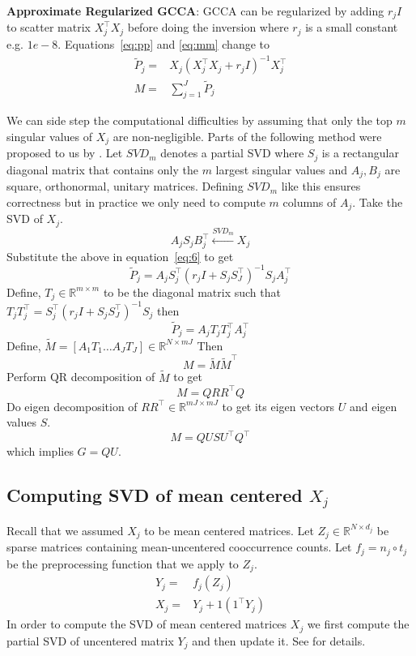 \documentclass[11pt]{article}
\begin{document}
\noindent\textbf{Approximate Regularized GCCA}: GCCA can be regularized by adding $r_jI$ to 
scatter matrix $X_j^\top X_j$ before doing the inversion where
$r_j$ is a small constant e.g. $1e-8$. Equations~\ref{eq:pp}
and \ref{eq:mm} change to
\begin{align}
  \widetilde{P}_{j} =& X_j(X_j^\top X_j+r_jI)^{-1}X_j^\top \label{eq:6}\\
  M =& \sum_{j=1}^J \widetilde{P}_{j} \label{eq:mmm}
\end{align}

We can side step the computational difficulties by assuming that only
the top $m$ singular values of $X_j$ are non-negligible. Parts of the
following method were proposed to us by \cite{savostyanov}.
Let $SVD_m$ denotes a partial SVD where $S_j$ is a rectangular diagonal
matrix that contains only the $m$ largest singular values and $A_j, B_j$
are square, orthonormal, unitary matrices. Defining $SVD_m$ like this
ensures correctness but in practice we only need to compute $m$
columns of $A_j$. Take the SVD of $X_j$.
$$A_{j} S_{j} B^\top_{j} \xleftarrow{SVD_{m}} X_j$$
 Substitute the above in equation~\ref{eq:6} to get 
$$\widetilde{P}_j = A_j S_j^\top(r_j I + S_j S_J^\top)^{-1}S_j A_j^\top$$ 
Define, $T_j \in \mathbb{R}^{m \times m}$ to be the diagonal matrix such that
$T_jT_j^\top = S_j^\top(r_j I + S_j S_J^\top)^{-1}S_j $ then
$$\widetilde{P}_j = A_j T_j T_j^\top A_j^\top$$
Define, $\tilde{M} = \left[ A_1T_1 \ldots A_JT_J \right] \in \mathbb{R}^{N
  \times mJ}$
Then 
$$M = \tilde{M} \tilde{M}^\top$$
Perform QR decomposition of $\tilde{M}$ to get
$$M = Q R R^\top Q$$
Do eigen decomposition of $R R^\top \in \mathbb{R}^{mJ \times mJ}$
to get its eigen vectors $U$ and eigen values $S$.
$$M = Q U S U^\top Q^\top$$
 which implies $G = QU$. 

\subsection{Computing SVD of mean centered $X_j$}
\label{ssec:svdmc}
Recall that we assumed $X_j$ to be mean centered matrices. Let $Z_j
\in \mathbb{R}^{N \times d_j}$ be sparse matrices containing
mean-uncentered cooccurrence counts. Let $f_j = n_j \circ t_j $ be the preprocessing
function that we apply to $Z_j$. 
\begin{align}
  Y_j =& f_j (Z_j) \\
  X_j =& Y_j + 1 (1^\top Y_j)
\end{align}
In order to compute the SVD of mean centered matrices $X_j$ we first
compute the partial SVD of uncentered 
matrix $Y_j$ and then update it. See \cite{brand2006fast} for details.
\end{document}
